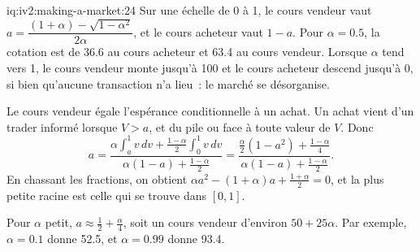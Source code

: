 \begin{solution}{iq:iv2:making-a-market:24}
Sur une échelle de 0 à 1, le cours vendeur vaut $a = \dfrac{(1 + \alpha) - \sqrt{1 - \alpha^2}}{2\alpha}$, et le cours acheteur vaut $1 - a$. Pour $\alpha = 0.5$, la cotation est de 36.6 au cours acheteur et 63.4 au cours vendeur. Lorsque $\alpha$ tend vers 1, le cours vendeur monte jusqu'à 100 et le cours acheteur descend jusqu'à 0, si bien qu'aucune transaction n'a lieu~: le marché se désorganise.

Le cours vendeur égale l'espérance conditionnelle à un achat. Un achat vient d'un trader informé lorsque $V > a$, et du pile ou face à toute valeur de $V$. Donc
\[
a = \frac{\alpha \int_a^1 v\,dv + \frac{1 - \alpha}{2} \int_0^1 v\,dv}{\alpha (1 - a) + \frac{1 - \alpha}{2}}
= \frac{\frac{\alpha}{2}(1 - a^2) + \frac{1 - \alpha}{4}}{\alpha(1 - a) + \frac{1 - \alpha}{2}}.
\]
En chassant les fractions, on obtient $\alpha a^2 - (1 + \alpha)a + \frac{1 + \alpha}{2} = 0$, et la plus petite racine est celle qui se trouve dans $[0, 1]$.

Pour $\alpha$ petit, $a \approx \frac12 + \frac{\alpha}{4}$, soit un cours vendeur d'environ $50 + 25\alpha$. Par exemple, $\alpha = 0.1$ donne 52.5, et $\alpha = 0.99$ donne 93.4.

\end{solution}

